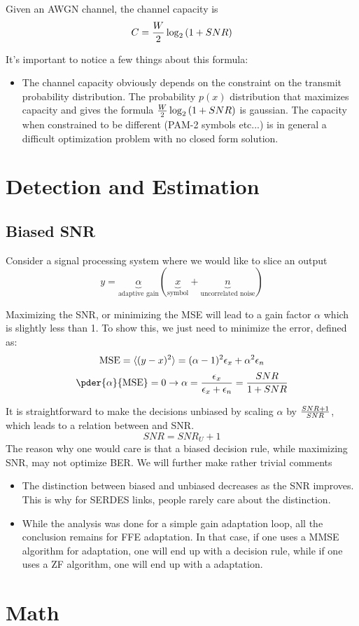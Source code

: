 \documentclass[11pt]{scrartcl}
\begin{document}
\begin{theorem}
	Given an AWGN channel, the channel capacity is
	\[C = {W \over 2} \log_2 \left(1 + {SNR} \right)\]
	\end{theorem}

It's important to notice a few things about this formula:
\begin{itemize}
	\item  The channel capacity obviously depends on the constraint on the transmit probability distribution.  The probability $p(x)$ distribution that maximizes capacity and gives the formula ${W \over 2}  \log_2 \left(1 + {SNR} \right)$ is gaussian.  The capacity when constrained to be different (PAM-2 symbols etc...) is in general a difficult optimization problem with no closed form solution.
	\end{itemize}


\section{Detection and Estimation}
\newpage
\subsection{Biased SNR}

Consider a signal processing system where we would like to slice an output
\[ y =  \underbrace{\alpha}_{\text{adaptive gain}} (\underbrace{x}_{\text{symbol}} + \underbrace{n}_{\text{uncorrelated noise}})\]

Maximizing the SNR, or minimizing the MSE will lead to a  gain factor $\alpha$ which is slightly less than 1.  To show this, we just need to minimize the error, defined as:
\[ \text{MSE} = \braket{(y - x)^2} = (\alpha - 1)^2 \epsilon_x + \alpha^2 \epsilon_n \]
\[ \pder{\alpha}{\text{MSE}} = 0 \rightarrow \alpha = {\epsilon_x \over \epsilon_x + \epsilon_n} = {SNR \over 1 + SNR} \]

It is straightforward to make the decisions unbiased by scaling $\alpha$ by ${SNR + 1 \over SNR}$, which leads to a relation between  and  SNR.
\[ SNR = SNR_{U} + 1 \]
The reason why one would care is that a biased decision rule, while maximizing SNR, may not optimize BER.  We will further make rather trivial comments

\begin{itemize}
\item The distinction between biased and unbiased decreases as the SNR improves.  This is why for SERDES links, people rarely care about the distinction.
\item  While the analysis was done for a simple gain adaptation loop, all the conclusion remains for FFE adaptation.  In that case, if one uses a MMSE algorithm for adaptation, one will end up with a  decision rule, while if one uses a ZF algorithm, one will end up with a  adaptation.
	\end{itemize}
\section{Math}
\end{document}
